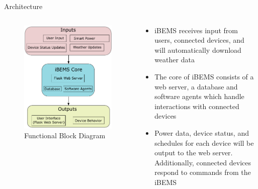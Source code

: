 \documentclass{beamer}
\begin{document}
\begin{frame}{Architecture}{} %
    \begin{columns}
        \begin{figure}
            \centering
            \includegraphics[scale=0.4]{figs/functionalBlockDiagram.pdf}
            \caption{Functional Block Diagram}
            \label{fig:functional_bd}
        \end{figure}
        \begin{block}{}
            \begin{small}
                \begin{itemize}
                    \item iBEMS receives input from users, connected devices, and will automatically download weather data
                    \item The core of iBEMS consists of a web server, a database and software agents which handle interactions with connected devices
                    \item Power data, device status, and schedules for each device will be output to the web server. Additionally, connected devices respond to commands from the iBEMS
                \end{itemize}
            \end{small}
        \end{block}
    \end{columns}
\end{frame}
\end{document}
